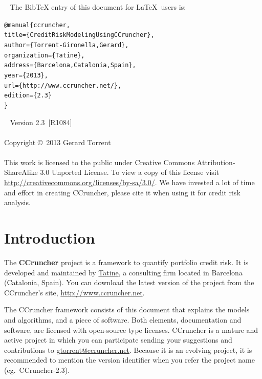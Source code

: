 \documentclass[11pt,fleqn]{book} %
\def\numversion{2.3}
\def\svnversion{R1084}
\begin{document}
~\vfill
The BibTeX entry of this document for \LaTeX\ users is:
\begin{alltt}
@manual\{ccruncher,
    title = \{Credit Risk Modeling Using CCruncher\},
    author = \{Torrent-Gironella, Gerard\},
    organization = \{Tatine\},
    address = \{Barcelona, Catalonia, Spain\},
    year = \{2013\},
    url = \{http://www.ccruncher.net/\},
    edition = \{\numversion\}
\}
\end{alltt}

~\vfill
\thispagestyle{empty}
\noindent Version \numversion\ [\svnversion]\\ 
\\
\noindent Copyright \copyright\ 2013 Gerard Torrent\\
\\
\noindent 
This work is licensed to the public under Creative Commons 
Attribution-ShareAlike 3.0 Unported License. To view a copy 
of this license visit 
\url{http://creativecommons.org/licenses/by-sa/3.0/}.
We have invested a lot of time and effort in creating CCruncher, 
please cite it when using it for credit risk analysis.


\pagestyle{empty}
\setcounter{tocdepth}{1}
\tableofcontents
\cleardoublepage
\pagestyle{fancy}


\chapter{Introduction}

The \textbf{CCruncher} project is a framework to quantify portfolio credit 
risk. It is developed and maintained by \href{http://www.tatine.es}{Tatine}, 
a consulting firm located in Barcelona (Catalonia, Spain). You can download 
the latest version of the project from the CCruncher's site, 
\url{http://www.ccruncher.net}.

The CCruncher framework consists of this document that explains the models 
and algorithms, and a piece of software. Both elements, documentation and 
software, are licensed with open-source type licenses. CCruncher is a mature 
and active project in which you can participate sending your suggestions and 
contributions to \href{mailto:gtorrent@ccruncher.net}{gtorrent@ccruncher.net}.
Because it is an evolving project, it is recommended to mention the version
identifier when you refer the project name (eg.\ CCruncher-\numversion).
\end{document}
